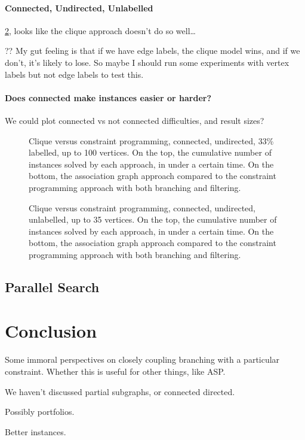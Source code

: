 \documentclass{llncs}
\begin{document}
\paragraph{Connected, Undirected, Unlabelled} \cref{figure:connected-plain}, looks like the clique
approach doesn't do so well\ldots

?? My gut feeling is that if we have edge labels, the clique model wins, and if we don't, it's
likely to lose. So maybe I should run some experiments with vertex labels but not edge labels to
test this.

\paragraph{Does connected make instances easier or harder?} We could plot connected vs not connected
difficulties, and result sizes?

\begin{figure}[p]
    \centering
    
    \caption{Clique versus constraint programming, connected, undirected, 33\% labelled, up to 100 vertices. On the top,
        the cumulative number of instances solved by each approach, in under a certain time. On the
        bottom, the association graph approach compared to the constraint programming approach with
        both branching and filtering.} \label{figure:connected-undir33}
\end{figure}

\begin{figure}[p]
    \centering
    
    \caption{Clique versus constraint programming, connected, undirected, unlabelled, up to 35 vertices. On the top, the
        cumulative number of instances solved by each approach, in under a certain time. On the
        bottom, the association graph approach compared to the constraint programming approach
    with both branching and filtering.}
\label{figure:connected-plain}
\end{figure}

\subsection{Parallel Search}

\cite{DBLP:conf/ictai/MinotNS15}

\section{Conclusion}

Some immoral perspectives on closely coupling branching with a particular constraint. Whether this
is useful for other things, like ASP.

We haven't discussed partial subgraphs, or connected directed.

Possibly portfolios.

Better instances.



\end{document}
